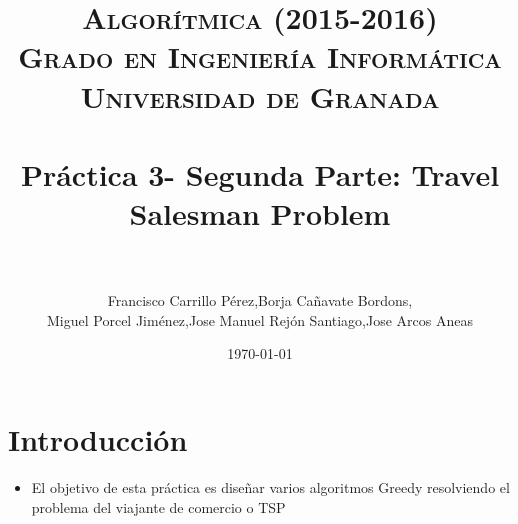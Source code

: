 
 \usepackage{algpseudocode}

\title{	
\normalfont \normalsize 
\textsc{{\bf Algorítmica (2015-2016)} \\ Grado en Ingeniería Informática \\ Universidad de Granada} \\ [25pt] %
\horrule{0.5pt} \\[0.4cm] %
\huge Práctica 3- Segunda Parte: Travel Salesman Problem \\ %
\horrule{2pt} \\[0.5cm] %
}

\author{Francisco Carrillo Pérez,Borja Cañavate Bordons, \\Miguel Porcel Jiménez,Jose Manuel Rejón Santiago,Jose Arcos Aneas} %

\date{\normalsize\today} %




\maketitle %

\newpage %

\tableofcontents %

\listoffigures

\listoftables

\newpage


	\section{Introducción }
	
		\begin{itemize}
			\item El objetivo de esta práctica es diseñar varios algoritmos Greedy resolviendo el problema del viajante de comercio o TSP
		\end{itemize}
	
